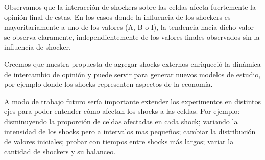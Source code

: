 
Observamos que la interacción de shockers sobre las celdas afecta fuertemente la opinión
final de estas. 
En los casos donde la influencia de los shockers es mayoritariamente a uno de los valores (A, B o I), la
tendencia hacia dicho valor se observa claramente, independientemente de los valores finales observados sin la influencia de shocker.

Creemos que nuestra propuesta de agregar shocks externos enriqueció la dinámica de
intercambio de opinión y puede servir para generar nuevos modelos de estudio, por ejemplo donde los shocks representen aspectos de la economía.

A modo de trabajo futuro sería importante extender los experimentos en
distintos ejes para poder entender cómo afectan los shocks a las celdas. Por
ejemplo: disminuyendo la proporción de celdas afectadas en cada shock; variando la 
intensidad de los shocks pero a intervalos mas pequeños;
cambiar la distribución de valores iniciales; probar con tiempos entre shocks
más largos; variar la cantidad de shockers y su balanceo.


